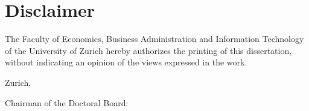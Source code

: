 \makeatletter
    \let\insertdate\@date
    \let\insertchairman\@chairman
    \newcommand{\unchapter}[1]{%
        \begingroup
        \let\@makeschapterhead\@gobble %
        \chapter*{#1}
        \endgroup
    }
\makeatother

\unchapter{Disclaimer}
\begin{singlespace}
    \noindent
    The Faculty of Economics, Business Administration and Information Technology of the University of Zurich hereby authorizes the printing of this dissertation, without indicating an opinion of the views expressed in the work.

    \vspace{1cm}
    \noindent
    Zurich, \monthdayyeardate\insertdate
    
    \vspace{0.4cm}
    \noindent
    Chairman of the Doctoral Board: \insertchairman
\end{singlespace}
